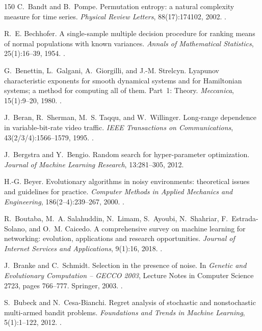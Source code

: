 \begin{thebibliography}{150}
C.~Bandt and B.~Pompe. Permutation entropy: a natural complexity measure for time series. \emph{Physical Review Letters}, 88(17):174102, 2002. .

R.~E. Bechhofer. A single-sample multiple decision procedure for ranking means of normal populations with known variances. \emph{Annals of Mathematical Statistics}, 25(1):16--39, 1954. .

G.~Benettin, L.~Galgani, A.~Giorgilli, and J.-M. Strelcyn. Lyapunov characteristic exponents for smooth dynamical systems and for Hamiltonian systems; a method for computing all of them. Part~1: Theory. \emph{Meccanica}, 15(1):9--20, 1980. .

J.~Beran, R.~Sherman, M.~S. Taqqu, and W.~Willinger. Long-range dependence in variable-bit-rate video traffic. \emph{IEEE Transactions on Communications}, 43(2/3/4):1566--1579, 1995. .

J.~Bergstra and Y.~Bengio. Random search for hyper-parameter optimization. \emph{Journal of Machine Learning Research}, 13:281--305, 2012.

H.-G. Beyer. Evolutionary algorithms in noisy environments: theoretical issues and guidelines for practice. \emph{Computer Methods in Applied Mechanics and Engineering}, 186(2--4):239--267, 2000. .

R.~Boutaba, M.~A. Salahuddin, N.~Limam, S.~Ayoubi, N.~Shahriar, F.~Estrada-Solano, and O.~M. Caicedo. A comprehensive survey on machine learning for networking: evolution, applications and research opportunities. \emph{Journal of Internet Services and Applications}, 9(1):16, 2018. .

J.~Branke and C.~Schmidt. Selection in the presence of noise. In \emph{Genetic and Evolutionary Computation -- GECCO 2003}, Lecture Notes in Computer Science 2723, pages 766--777. Springer, 2003. .

S.~Bubeck and N.~Cesa-Bianchi. Regret analysis of stochastic and nonstochastic multi-armed bandit problems. \emph{Foundations and Trends in Machine Learning}, 5(1):1--122, 2012. .


\end{thebibliography}
